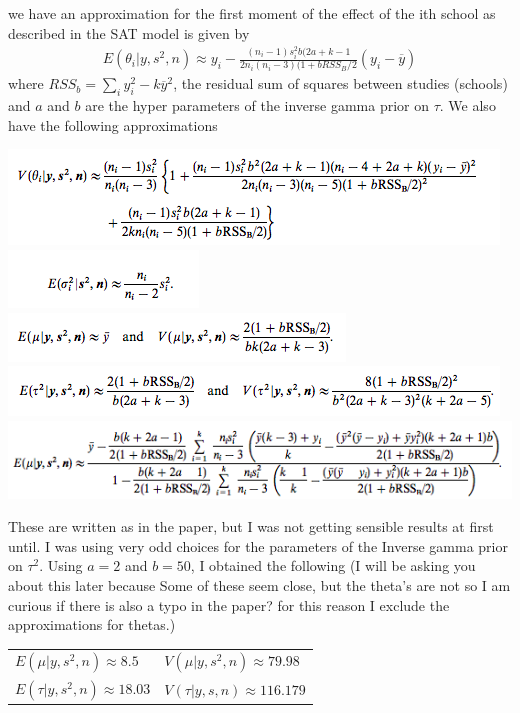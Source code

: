 \documentclass[a4paper, 9pt]{article}
\begin{document}
we have an approximation for the first moment of the effect of the ith school as described in the SAT model is given by
\begin{align*}
    E(\theta_i|y, s^2, n) \approx y_i - \frac{(n_i - 1) s_i^2 b (2a + k - 1}{2 n_i (n_i -3) (1 +bRSS_B/2}(y_i - \overline{y})
\end{align*}
where $RSS_b = \sum_i y_i^2 - k\overline{y}^2$, the residual sum of squares between studies (schools) and $a$ and $b$ are the hyper parameters of the inverse gamma prior on $\tau$. We also have the following approximations
\begin{center}
    \includegraphics[scale = 0.7]{paper1.png}\\
    \includegraphics[scale = 0.7]{paper2.png}\\
    \includegraphics[scale = 0.7]{paper3.png}\\
    \includegraphics[scale = 0.7]{paper4.png}\\
    \includegraphics[scale = 0.7]{paper5.png}
\end{center}

These are written as in the paper, but I was not getting sensible results at first until. I was using very odd choices for the parameters of the Inverse gamma prior on $\tau^2$. Using $a=2$ and $b = 50$, I obtained the following (I will be asking you about this later because Some of these seem close, but the theta's are not so I am curious if there is also a typo in the paper? for this reason I exclude the approximations for thetas.)
\begin{center}
\begin{tabular}{ll}
\hline
\hline
     $E(\mu|y,s^2,n) \approx 8.5$ & $V(\mu|y,s^2,n) \approx 79.98$  \\
     $E(\tau|y,s^2,n) \approx 18.03$ & $V(\tau|y,s,n) \approx 116.179$\\
     \hline\hline
\end{tabular}
\end{center}
\end{document}
